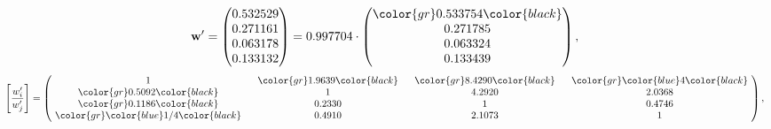 \begin{example}
\begin{equation*}
\mathbf{w}^{\prime} =
\begin{pmatrix}
0.532529\\
0.271161\\
0.063178\\
0.133132
\end{pmatrix} =
0.997704\cdot
\begin{pmatrix}
\color{gr} 0.533754\color{black} \\
0.271785\\
0.063324\\
0.133439
\end{pmatrix},
\end{equation*}
\begin{equation*}
\left[ \frac{{w}^{\prime}_i}{{w}^{\prime}_j} \right] =
\begin{pmatrix}
$\,\,$ 1 $\,\,$ & $\,\,$\color{gr} 1.9639\color{black} $\,\,$ & $\,\,$\color{gr} 8.4290\color{black} $\,\,$ & $\,\,$\color{gr} \color{blue} 4\color{black} $\,\,$ \\
$\,\,$\color{gr} 0.5092\color{black} $\,\,$ & $\,\,$ 1 $\,\,$ & $\,\,$4.2920$\,\,$ & $\,\,$2.0368  $\,\,$ \\
$\,\,$\color{gr} 0.1186\color{black} $\,\,$ & $\,\,$0.2330$\,\,$ & $\,\,$ 1 $\,\,$ & $\,\,$0.4746 $\,\,$ \\
$\,\,$\color{gr} \color{blue}  1/4\color{black} $\,\,$ & $\,\,$0.4910$\,\,$ & $\,\,$2.1073$\,\,$ & $\,\,$ 1  $\,\,$ \\
\end{pmatrix},
\end{equation*}
\end{example}
\newpage
